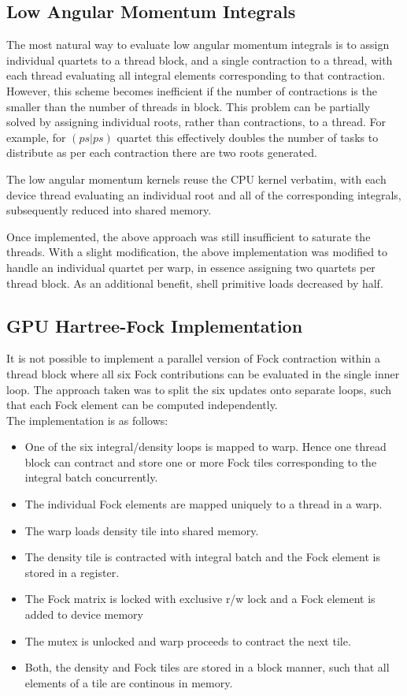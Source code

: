\documentclass[12pt]{article}
\begin{document}
\subsection*{Low Angular Momentum Integrals}

The most natural way to evaluate low angular momentum integrals is to
assign individual quartets to a thread block, and a single contraction
to a thread, with each thread evaluating all integral elements
corresponding to that contraction.  However, this scheme becomes
inefficient if the number of contractions is the smaller than the
number of threads in block.  This problem can be partially solved by
assigning individual roots, rather than contractions, to a thread.
For example, for $(ps|ps)$ quartet this effectively doubles the number
of tasks to distribute as per each contraction there are two roots
generated.

The low angular momentum kernels reuse the CPU kernel verbatim, with
each device thread evaluating an individual root and all of the
corresponding integrals, subsequently reduced into shared memory.

Once implemented, the above approach was still insufficient to saturate
the threads.  With a slight modification, the
above implementation was modified to handle an individual quartet per
warp, in essence assigning two quartets per thread block.  As an
additional benefit, shell primitive loads decreased by half.

\subsection*{GPU Hartree-Fock Implementation}
It is not possible to implement a parallel version of Fock contraction
within a thread block where all six Fock contributions can be
evaluated in the single inner loop.  The approach taken was to split the
six updates onto separate loops, such that each Fock element can be 
 computed independently. \\
The implementation is as follows:

\begin{itemize}
\item One of the six integral/density loops is mapped to warp.
  Hence one thread block can contract and store one or more Fock
  tiles corresponding to the integral batch concurrently.
\item The individual Fock elements are mapped uniquely to a thread in a warp.
\item The warp loads density tile into shared memory.
\item The density tile is contracted with integral batch and the 
  Fock element is stored in a register.
\item The  Fock matrix is locked with exclusive r/w lock and
  a Fock element is added to device memory
\item The mutex is unlocked and warp proceeds to contract the next tile.
\item Both, the density and Fock tiles are stored in a block manner, such
  that all elements of a tile are continous in memory.
\end{itemize}
\end{document}
